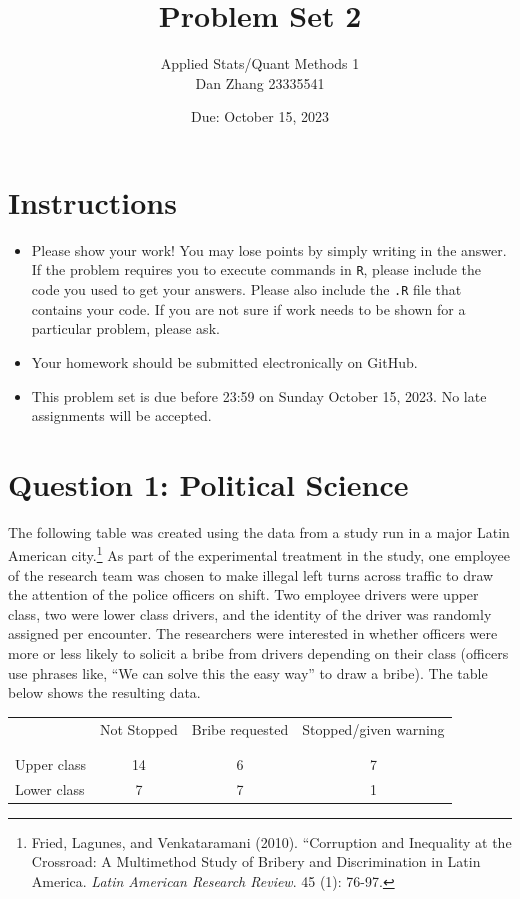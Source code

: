 \documentclass[12pt,letterpaper]{article}
\title{Problem Set 2}
\date{Due: October 15, 2023}
\author{Applied Stats/Quant Methods 1 \\ Dan Zhang 23335541}
\begin{document}
	\maketitle
	\section*{Instructions}
\begin{itemize}
	\item Please show your work! You may lose points by simply writing in the answer. If the problem requires you to execute commands in \texttt{R}, please include the code you used to get your answers. Please also include the \texttt{.R} file that contains your code. If you are not sure if work needs to be shown for a particular problem, please ask.
	\item Your homework should be submitted electronically on GitHub.
	\item This problem set is due before 23:59 on Sunday October 15, 2023. No late assignments will be accepted.

\end{itemize}

	
	\vspace{.5cm}
	\section*{Question 1: Political Science}
		\vspace{.25cm}
	The following table was created using the data from a study run in a major Latin American city.\footnote{Fried, Lagunes, and Venkataramani (2010). ``Corruption and Inequality at the Crossroad: A Multimethod Study of Bribery and Discrimination in Latin America. \textit{Latin American Research Review}. 45 (1): 76-97.} As part of the experimental treatment in the study, one employee of the research team was chosen to make illegal left turns across traffic to draw the attention of the police officers on shift. Two employee drivers were upper class, two were lower class drivers, and the identity of the driver was randomly assigned per encounter. The researchers were interested in whether officers were more or less likely to solicit a bribe from drivers depending on their class (officers use phrases like, ``We can solve this the easy way'' to draw a bribe). The table below shows the resulting data.

\newpage
\begin{table}[h!]
	\centering
	\begin{tabular}{l | c c c }
		& Not Stopped & Bribe requested & Stopped/given warning \\
		\\[-1.8ex] 
		\hline \\[-1.8ex]
		Upper class & 14 & 6 & 7 \\
		Lower class & 7 & 7 & 1 \\
		\hline
	\end{tabular}
\end{table}
\end{document}
